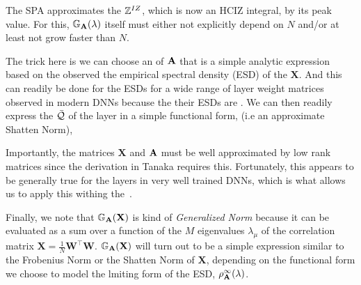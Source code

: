 The SPA approximates the \PartitionFunction $\mathbb{Z}^{IZ}$, which is now an HCIZ integral,  by its peak value.
For this, $\mathbb{G}_{\mathbf{A}}(\lambda)$ itself must either not explicitly depend on $N$ and/or at least not grow faster than $N$.

The trick here is we can choose an \RTransform of $\mathbf{\mathbf{A}}$
that is a simple analytic expression based on the observed
the empirical spectral density (ESD) of the $\mathbf{X}$.
And this can readily be done for the ESDs for a wide range of layer weight matrices
observed in modern DNNs because the their ESDs are \HeavyTailed \PowerLaw\cite{MM19_HTSR_ICML}.
We can then readily express the \Quality $\bar{\mathcal{Q}}$ of the \Teacher
layer in a simple functional form, (i.e  an approximate Shatten Norm),

Importantly, the matrices $\mathbf{X}$  and $\mathbf{\mathbf{A}}$ must be well approximated
by low rank matrices since the derivation in Tanaka requires this.  Fortunately,
this appears to be generally true for the layers in very well trained DNNs,
which is what allows us to apply this withing the~\ECS.

Finally, we note that $\mathbb{G}_{\mathbf{A}}(\mathbf{X})$ is kind of \emph{Generalized Norm} because 
it can be evaluated as a sum over a function of the $M$ eigenvalues $\lambda_{\mu}$ of the \Teacher
correlation matrix $\mathbf{X}=\frac{1}{N}\mathbf{W}^{\top}\mathbf{W}$.
$\mathbb{G}_{\mathbf{A}}(\mathbf{X})$  will turn out to be a simple expression similar to the Frobenius Norm or the
Shatten Norm of $\mathbf{X}$, depending on the functional form we choose to model the
lmiting form of the \Student ESD, $\rho_{\mathbf{A}}^{\infty}(\lambda)$.

